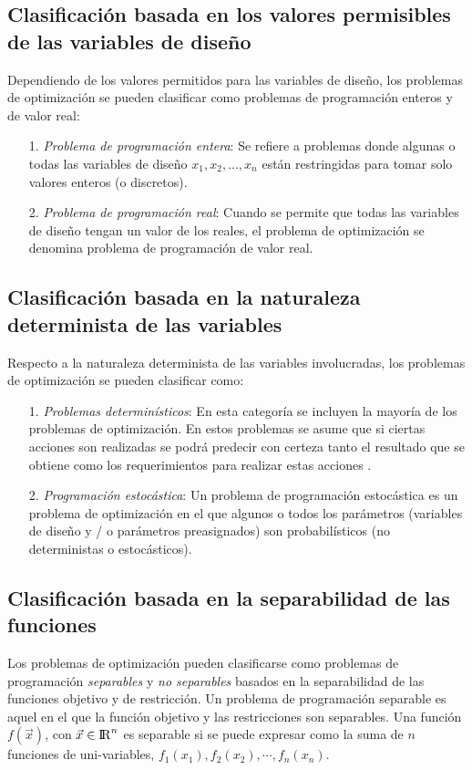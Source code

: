 \subsection{Clasificación basada en los valores permisibles de las variables de diseño}
Dependiendo de los valores permitidos para las variables de diseño, los problemas de optimización se pueden clasificar como problemas de programación enteros y de valor real:
\begin{itemize}
\item[1.] \textit{Problema de programación entera}: Se refiere a problemas donde algunas o todas las variables de diseño $x_1, x_2, ..., x_n$ están restringidas para tomar solo valores enteros (o discretos).
\item[2.] \textit{Problema de programación real}: Cuando se permite que todas las variables de diseño tengan un valor de los reales, el problema de optimización se denomina problema de programación de valor real.

\end{itemize}
\subsection{Clasificación basada en la naturaleza determinista de las variables}
Respecto a la naturaleza determinista de las variables involucradas, los problemas de optimización se pueden clasificar como:
\begin{itemize}
\item [1.]\textit{Problemas determinísticos}: En esta categoría se incluyen la mayoría de los problemas de optimización. En estos problemas se asume que si ciertas acciones son realizadas se podrá predecir con certeza tanto el resultado que se obtiene como los requerimientos para realizar estas acciones \cite{dantzig_linear_2016}.
\item[2.] \textit{Programación estocástica}:
Un problema de programación estocástica es un problema de optimización en el que algunos o todos los parámetros (variables de diseño y / o parámetros preasignados) son probabilísticos (no deterministas o estocásticos).

\end{itemize}
 
\subsection{Clasificación basada en la separabilidad de las funciones} 
Los problemas de optimización pueden clasificarse como problemas de programación \textit{separables} y\textit{ no separables} basados en la separabilidad de las funciones objetivo y de restricción. Un problema de programación separable es aquel en el que la función objetivo y las restricciones son separables. Una función $f(\vec{x})$, con $\vec{x} \in {\rm I\!R}^{n}$ es separable si se puede expresar como la suma de $n$ funciones de uni-variables, $ f_1(x_1), f_2 (x_2), \cdots, f_n (x_n)$.

